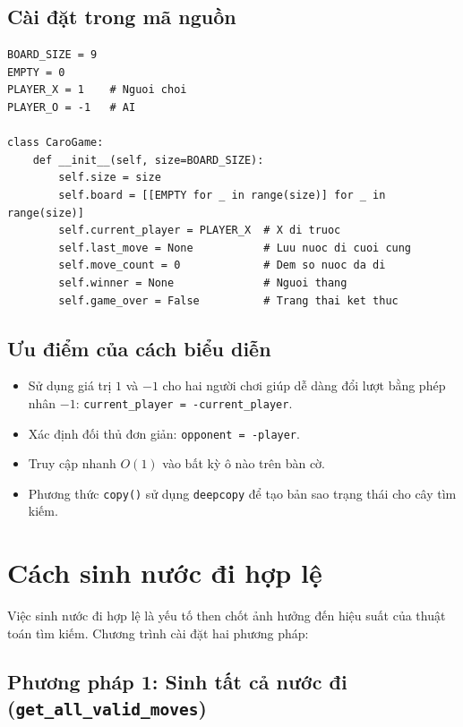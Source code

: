 \documentclass[12pt,a4paper]{article}
\begin{document}
\subsection{Cài đặt trong mã nguồn}

\begin{lstlisting}[caption={Biểu diễn trạng thái bàn cờ (\texttt{caro\_game.py})}]
BOARD_SIZE = 9
EMPTY = 0
PLAYER_X = 1    # Nguoi choi
PLAYER_O = -1   # AI

class CaroGame:
    def __init__(self, size=BOARD_SIZE):
        self.size = size
        self.board = [[EMPTY for _ in range(size)] for _ in range(size)]
        self.current_player = PLAYER_X  # X di truoc
        self.last_move = None           # Luu nuoc di cuoi cung
        self.move_count = 0             # Dem so nuoc da di
        self.winner = None              # Nguoi thang
        self.game_over = False          # Trang thai ket thuc
\end{lstlisting}

\subsection{Ưu điểm của cách biểu diễn}

\begin{itemize}
    \item Sử dụng giá trị $1$ và $-1$ cho hai người chơi giúp dễ dàng đổi lượt bằng phép nhân $-1$: \texttt{current\_player = -current\_player}.
    \item Xác định đối thủ đơn giản: \texttt{opponent = -player}.
    \item Truy cập nhanh $O(1)$ vào bất kỳ ô nào trên bàn cờ.
    \item Phương thức \texttt{copy()} sử dụng \texttt{deepcopy} để tạo bản sao trạng thái cho cây tìm kiếm.
\end{itemize}

\section{Cách sinh nước đi hợp lệ}

Việc sinh nước đi hợp lệ là yếu tố then chốt ảnh hưởng đến hiệu suất của thuật toán tìm kiếm. Chương trình cài đặt hai phương pháp:

\subsection{Phương pháp 1: Sinh tất cả nước đi (\texttt{get\_all\_valid\_moves})}
\end{document}
